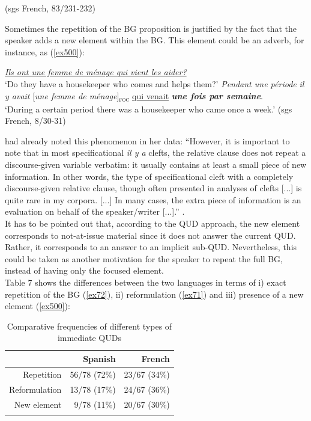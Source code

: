 \hfill (sgs French, 83/231-232)    
\z \z


 Sometimes the repetition of the BG proposition is justified by the fact that the speaker adds a new element within the BG. This element could be an adverb, for instance, as (\ref{ex500}):

\ea \label{ex500}
\ea	\uline{\textit{Ils ont une femme de ménage qui vient les aider?}}\\
 `Do they have a housekeeper who comes and helps them?'
\ex \textit{Pendant une période }\textit{il y avait} {[\textit{une femme de ménage}]\textsubscript{\textsc{foc}}} \normalsize \uline{qui venait} \textit{\textbf{une fois par semaine}}.\\
`During a certain period there was a housekeeper who came once a week.' \hfill (sgs French, 8/30-31)    
\z \z


\textcite{karssenberg2017oiseaux, karssenberg20188} had already noted this phenomenon in her data: ``However, it is important to note that in most specificational \textit{il y a}  clefts, the relative clause does not repeat a discourse-given variable verbatim: it usually contains at least a small piece of new information. In other words, the type of specificational cleft with a completely discourse-given relative clause, though often presented in analyses of clefts [...] is quite rare in my corpora. [...] In many cases, the extra piece of information is an evaluation on behalf of the speaker/writer [...].” \parencite[251]{karssenberg2017oiseaux}. \\
It has to be pointed out that, according to the QUD approach, the new element corresponds to not-at-issue material since it does not answer the current QUD. Rather, it corresponds to an answer to an implicit sub-QUD. Nevertheless, this could be taken as another motivation for the speaker to repeat the full BG, instead of having only the focused element.\\
Table 7 shows the differences between the two languages in terms of i) exact repetition of the BG (\ref{ex72}), ii) reformulation (\ref{ex71}) and iii) presence of a new element (\ref{ex500}):

\begin{table}[ht]

\begin{tabular}{rrr}
  \lsptoprule
 & Spanish & French \\ 
  \midrule
Repetition & 56/78 (72\%) & 23/67 (34\%) \\ 
Reformulation & 13/78 (17\%)  & 24/67 (36\%) \\ 
New element & 9/78 (11\%)  &  20/67 (30\%)  \\ 
   \lspbottomrule
\end{tabular}
\caption{Comparative frequencies of different types of immediate QUDs}
\end{table}

